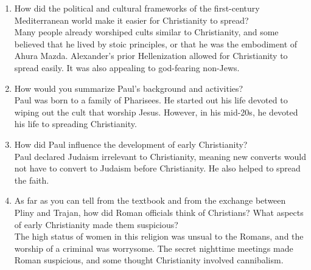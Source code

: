 \documentclass{article}
\begin{document}
\begin{enumerate}
  \item How did the political and cultural frameworks of the first-century Mediterranean
  world make it easier for Christianity to spread? \\
  Many people already worshiped cults similar to Christianity, and some believed that he
  lived by stoic principles, or that he was the embodiment of Ahura Mazda. Alexander's prior
  Hellenization allowed for Christianity to spread easily. It was also appealing to god-fearing
  non-Jews.
  \item How would you summarize Paul’s background and activities? \\
  Paul was born to a family of Pharisees. He started out his life devoted to wiping out the
  cult that worship Jesus. However, in his mid-20s, he devoted his life to spreading
  Christianity.
  \item How did Paul influence the development of early Christianity? \\
  Paul declared Judaism irrelevant to Christianity, meaning new converts would
  not have to convert to Judaism before Christianity. He also helped to spread the faith.
  \item As far as you can tell from the textbook and from the exchange between Pliny and
  Trajan, how did Roman officials think of Christians? What aspects of early Christianity
  made them suspicious? \\
  The high status of women in this religion was unsual to the Romans, and the worship of
  a criminal was worrysome. The secret nighttime meetings made Roman suspicious, and
  some thought Christianity involved cannibalism.
\end{enumerate}
\end{document}
